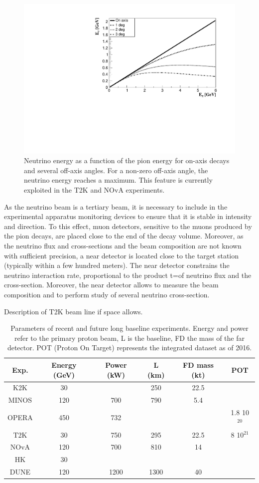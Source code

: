 \begin{figure}[htbp]
\centering
\includegraphics[width=0.6\linewidth]{figures/offaxis.pdf}
  \caption{Neutrino energy as a function of the pion energy for on-axis decays and several off-axis angles. For a non-zero off-axis angle, the neutrino energy reaches a maximum. This feature is currently exploited in the T2K and NOvA experiments.}
 \label{fig:offaxis}
 \end{figure}


As the neutrino beam is a tertiary beam, it is necessary to include in the experimental apparatus monitoring devices to ensure that it is stable in intensity and direction. To this effect, muon detectors, sensitive to the muons produced by the pion decays, are placed close to the end of the decay volume. Moreover, as the neutrino flux and cross-sections and the beam composition are not known with sufficient precision, a near detector is located close to the target station (typically within a few hundred meters). The near detector constrains the neutrino interaction rate, proportional to the product t=of neutrino flux and the cross-section. Moreover, the near detector allows to measure the beam composition and to perform study of several neutrino cross-section.    

Description of T2K beam line if space allows.

\begin{table}
\centering
\begin{tabular}{|c|c|c|c|c|c|}
  \hline
  Exp. & Energy (GeV) & Power (kW) & L (km) & FD mass (kt) & POT \\ 
  \hline
K2K & 30 & & 250 & 22.5 & \\
MINOS & 120 & 700 & 790 & 5.4 &\\
OPERA & 450 & 732 &  & & 1.8 10$^{20}$\\
T2K & 30 & 750 & 295 & 22.5 & 8 10$^{21}$\\
NOvA & 120 & 700& 810 & 14 & \\
HK & 30 & & & & \\
DUNE & 120 & 1200 & 1300 & 40 &\\
  \hline
\end{tabular}
\caption{Parameters of recent and future long baseline experiments. Energy and power refer to the primary proton beam, L is the baseline, FD the mass of the far detector. POT (Proton On Target) represents the integrated dataset as of 2016.}
\end{table}


